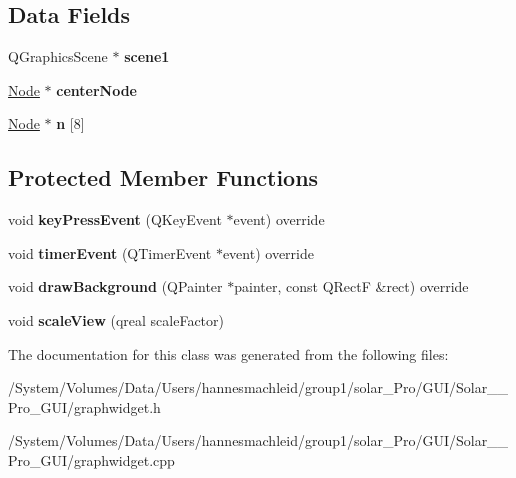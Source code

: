\subsection*{Data Fields}
\begin{DoxyCompactItemize}
\item 
\mbox{\label{class_graph_widget_a038f7c79d80bdf0c7b12543d2b29b8e4}} 
Q\+Graphics\+Scene $\ast$ {\bfseries scene1}
\item 
\mbox{\label{class_graph_widget_a512eaaed2c19a7e4711e895baa1d5d21}} 
\mbox{\hyperlink{class_node}{Node}} $\ast$ {\bfseries center\+Node}
\item 
\mbox{\label{class_graph_widget_ac50a7fcc91516e208b363abbaff2539a}} 
\mbox{\hyperlink{class_node}{Node}} $\ast$ {\bfseries n} \mbox{[}8\mbox{]}
\end{DoxyCompactItemize}
\subsection*{Protected Member Functions}
\begin{DoxyCompactItemize}
\item 
\mbox{\label{class_graph_widget_a5e746c6f6066156d91dbe54b89acebf0}} 
void {\bfseries key\+Press\+Event} (Q\+Key\+Event $\ast$event) override
\item 
\mbox{\label{class_graph_widget_aa9c0cde9388e97a5043e9554a1267ebe}} 
void {\bfseries timer\+Event} (Q\+Timer\+Event $\ast$event) override
\item 
\mbox{\label{class_graph_widget_ae535bf8a0da25f237c6f574a2980d6c9}} 
void {\bfseries draw\+Background} (Q\+Painter $\ast$painter, const Q\+RectF \&rect) override
\item 
\mbox{\label{class_graph_widget_a57394671d927af2df553f1e04cb88584}} 
void {\bfseries scale\+View} (qreal scale\+Factor)
\end{DoxyCompactItemize}


The documentation for this class was generated from the following files\+:\begin{DoxyCompactItemize}
\item 
/\+System/\+Volumes/\+Data/\+Users/hannesmachleid/group1/solar\+\_\+\+Pro/\+G\+U\+I/\+Solar\+\_\+\+\_\+\+Pro\+\_\+\+G\+U\+I/graphwidget.\+h\item 
/\+System/\+Volumes/\+Data/\+Users/hannesmachleid/group1/solar\+\_\+\+Pro/\+G\+U\+I/\+Solar\+\_\+\+\_\+\+Pro\+\_\+\+G\+U\+I/graphwidget.\+cpp\end{DoxyCompactItemize}
